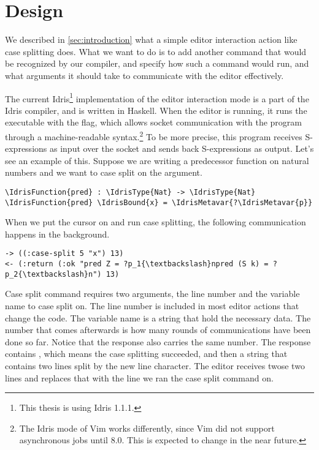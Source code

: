 \section{Design} \label{sec:design}

We described in \autoref{sec:introduction} what a simple editor interaction
action like case splitting does.  What we want to do is to add another command
that would be recognized by our compiler, and specify how such a command would
run, and what arguments it should take to communicate with the editor
effectively.

The current Idris\footnote{This thesis is using Idris 1.1.1.} implementation of
the editor interaction mode is a part of the Idris compiler, and is written in
Haskell. When the editor is running,
it runs the  executable with the  flag, which
allows socket communication with the program through a machine-readable
syntax.\footnote{The Idris mode of Vim works differently, since Vim did not
support asynchronous jobs until 8.0. This is expected to change in the near
future.}
To be more precise, this program receives S-expressions\cite{mccarthy} as input
over the socket and sends back S-expressions as output. Let's see an example of
this. Suppose we are writing a predecessor function on natural numbers and we
want to case split on the argument.

\begin{Verbatim}
\IdrisFunction{pred} : \IdrisType{Nat} -> \IdrisType{Nat}
\IdrisFunction{pred} \IdrisBound{x} = \IdrisMetavar{?\IdrisMetavar{p}}
\end{Verbatim}

When we put the cursor on  and run case splitting, the following
communication happens in the background.

\begin{Verbatim}
-> ((:case-split 5 "x") 13)
<- (:return (:ok "pred Z = ?p_1{\textbackslash}npred (S k) = ?p_2{\textbackslash}n") 13)
\end{Verbatim}

Case split command requires two arguments, the line number and the variable
name to case split on. The line number is included in most editor actions that
change the code. The variable name is a string that hold the necessary data.
The number  that comes afterwards is how many rounds of communications
have been done so far. Notice that the response also carries the same number.
The response contains , which means the case splitting succeeded,
and then a string that contains two lines split by the new line character.
The editor receives twose two lines and replaces that with the line we ran the
case split command on.

